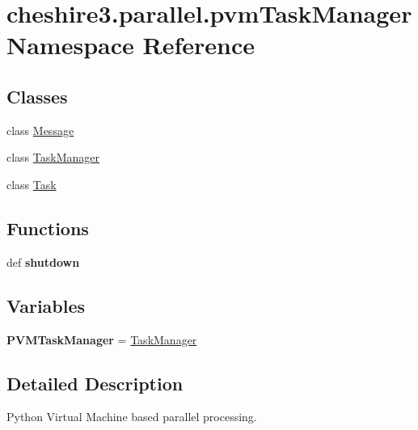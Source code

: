 \hypertarget{namespacecheshire3_1_1parallel_1_1pvm_task_manager}{\section{cheshire3.\-parallel.\-pvm\-Task\-Manager Namespace Reference}
\label{namespacecheshire3_1_1parallel_1_1pvm_task_manager}
}
\subsection*{Classes}
\begin{DoxyCompactItemize}
\item 
class \hyperlink{classcheshire3_1_1parallel_1_1pvm_task_manager_1_1_message}{Message}
\item 
class \hyperlink{classcheshire3_1_1parallel_1_1pvm_task_manager_1_1_task_manager}{Task\-Manager}
\item 
class \hyperlink{classcheshire3_1_1parallel_1_1pvm_task_manager_1_1_task}{Task}
\end{DoxyCompactItemize}
\subsection*{Functions}
\begin{DoxyCompactItemize}
\item 
\hypertarget{namespacecheshire3_1_1parallel_1_1pvm_task_manager_af69824b9491a3e58865f3ff9cdfbae9f}{def {\bfseries shutdown}}\label{namespacecheshire3_1_1parallel_1_1pvm_task_manager_af69824b9491a3e58865f3ff9cdfbae9f}

\end{DoxyCompactItemize}
\subsection*{Variables}
\begin{DoxyCompactItemize}
\item 
\hypertarget{namespacecheshire3_1_1parallel_1_1pvm_task_manager_ae3d0f3d8d84ac032500ff9a603fdd284}{{\bfseries P\-V\-M\-Task\-Manager} = \hyperlink{classcheshire3_1_1parallel_1_1pvm_task_manager_1_1_task_manager}{Task\-Manager}}\label{namespacecheshire3_1_1parallel_1_1pvm_task_manager_ae3d0f3d8d84ac032500ff9a603fdd284}

\end{DoxyCompactItemize}


\subsection{Detailed Description}
\begin{DoxyVerb}Python Virtual Machine based parallel processing.\end{DoxyVerb}
 